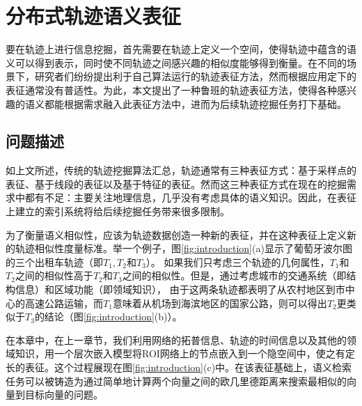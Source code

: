 
\chapter{分布式轨迹语义表征}
\label{chapter:main2}

要在轨迹上进行信息挖掘，首先需要在轨迹上定义一个空间，使得轨迹中蕴含的语义可以得到表示，同时使不同轨迹之间感兴趣的相似度能够得到衡量。在不同的场景下，研究者们纷纷提出利于自己算法运行的轨迹表征方法，然而根据应用定下的表征通常没有普适性。为此，本文提出了一种鲁班的轨迹表征方法，使得各种感兴趣的语义都能根据需求融入此表征方法中，进而为后续轨迹挖掘任务打下基础。


\section{问题描述}
如上文所述，传统的轨迹挖掘算法汇总，轨迹通常有三种表征方式：基于采样点的表征、基于线段的表征以及基于特征的表征。然而这三种表征方式在现在的挖掘需求中都有不足：主要关注地理信息，几乎没有考虑具体的语义知识。因此，在表征上建立的索引系统将给后续挖掘任务带来很多限制。

为了衡量语义相似性，应该为轨迹数据创造一种新的表征，并在这种表征上定义新的轨迹相似性度量标准。举一个例子，图\ref{fig:introduction}(a)显示了葡萄牙波尔图的三个出租车轨迹（即$ T_1, T_2$和$T_3 $）。 如果我们只考虑三个轨迹的几何属性，$ T_1 $和$ T_2 $之间的相似性高于$ T_2 $和$ T_3 $之间的相似性。但是，通过考虑城市的交通系统（即结构信息）和区域功能（即领域知识）， 由于这两条轨迹都表明了从农村地区到市中心的高速公路运输，而$T_1$意味着从机场到海滨地区的国家公路，则可以得出$ T_2 $更类似于$ T_3 $的结论（图\ref{fig:introduction}(b)）。

在本章中，在上一章节，我们利用网络的拓普信息、轨迹的时间信息以及其他的领域知识，用一个层次嵌入模型将ROI网络上的节点嵌入到一个隐空间中，使之有定长的表征。这个过程展现在图\ref{fig:introduction}(c)中。在该表征基础上，语义检索任务可以被铸造为通过简单地计算两个向量之间的欧几里德距离来搜索最相似的向量到目标向量的问题。

